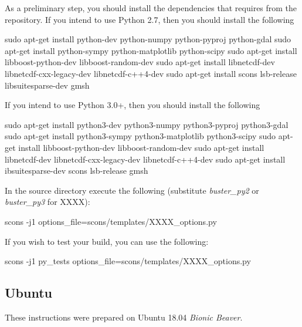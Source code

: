 \noindent As a preliminary step, you should install the dependencies that \esfinley requires from the repository.
If you intend to use Python 2.7, then you should install the following
\begin{shellCode}
sudo apt-get install python-dev python-numpy python-pyproj python-gdal
sudo apt-get install python-sympy python-matplotlib python-scipy
sudo apt-get install libboost-python-dev libboost-random-dev
sudo apt-get install libnetcdf-dev libnetcdf-cxx-legacy-dev libnetcdf-c++4-dev
sudo apt-get install scons lsb-release libsuitesparse-dev gmsh
\end{shellCode}

\noindent If you intend to use Python 3.0+, then you should install the following
\begin{shellCode}
sudo apt-get install python3-dev python3-numpy python3-pyproj python3-gdal
sudo apt-get install python3-sympy python3-matplotlib python3-scipy
sudo apt-get install libboost-python-dev libboost-random-dev
sudo apt-get install libnetcdf-dev libnetcdf-cxx-legacy-dev libnetcdf-c++4-dev
sudo apt-get install ibsuitesparse-dev scons lsb-release gmsh
\end{shellCode}

\noindent In the source directory execute the following (substitute \textit{buster_py2} or \textit{buster_py3} for XXXX):
\begin{shellCode}
scons -j1 options_file=scons/templates/XXXX_options.py
\end{shellCode}

\noindent If you wish to test your build, you can use the following:
\begin{shellCode}
scons -j1 py_tests options_file=scons/templates/XXXX_options.py
\end{shellCode}


\subsection{Ubuntu}\label{sec:ubsrc}
These instructions were prepared on Ubuntu 18.04 \textit{Bionic Beaver}. \newline


